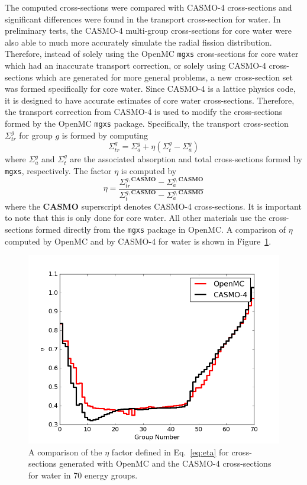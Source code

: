 \begin{appendices}
The computed cross-sections were compared with CASMO-4 cross-sections and significant differences were found in the transport cross-section for water. In preliminary tests, the CASMO-4 multi-group cross-sections for core water were also able to much more accurately simulate the radial fission distribution. Therefore, instead of solely using the OpenMC \texttt{mgxs} cross-sections for core water which had an inaccurate transport correction, or solely using CASMO-4 cross-sections which are generated for more general problems, a new cross-section set was formed specifically for core water. Since CASMO-4 is a lattice physics code, it is designed to have accurate estimates of core water cross-sections. Therefore, the transport correction from CASMO-4 is used to modify the cross-sections formed by the OpenMC \texttt{mgxs} package. Specifically, the transport cross-section $\Sigma_{tr}^g$ for group $g$ is formed by computing
\begin{equation}
\Sigma_{tr}^g = \Sigma_{a}^g + \eta \left( \Sigma_{t}^g - \Sigma_{a}^g \right)
\end{equation}
where $\Sigma_{a}^g$ and $\Sigma_{t}^g$ are the associated absorption and total cross-sections formed by \texttt{mgxs}, respectively. The factor $\eta$ is computed by
\begin{equation}
\eta = \frac{\Sigma_{tr}^{g, \textbf{CASMO}} - \Sigma_{a}^{g, \textbf{CASMO}}}{\Sigma_{t}^{g, \textbf{CASMO}} - \Sigma_{a}^{g, \textbf{CASMO}}}
\label{eq:eta}
\end{equation}
where the \textbf{CASMO} superscript denotes CASMO-4 cross-sections. It is important to note that this is only done for core water. All other materials use the cross-sections formed directly from the \texttt{mgxs} package in OpenMC. A comparison of $\eta$ computed by OpenMC and by CASMO-4 for water is shown in Figure~\ref{fig:eta}.

\begin{figure}[h!]
	\centering
	\includegraphics[width=0.7\linewidth]{figures/beavrs-visual/eta.png}
	\caption{A comparison of the $\eta$ factor defined in Eq.~\ref{eq:eta} for cross-sections generated with OpenMC and the CASMO-4 cross-sections for water in 70 energy groups.}
	\label{fig:eta}
\end{figure} 


\end{appendices}
